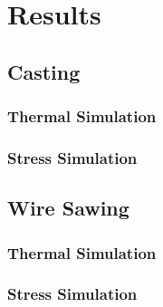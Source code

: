 \chapter{Results}

\section{Casting}

\subsection{Thermal Simulation}

\subsection{Stress Simulation}


\section{Wire Sawing}

\subsection{Thermal Simulation}

\subsection{Stress Simulation}